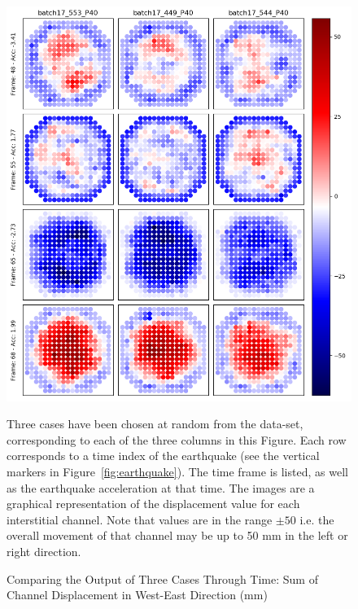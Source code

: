 \begin{figure}[p]
	\centering
	\includegraphics[scale=0.45]{Figures/results1.png}
	\caption{Comparing the Output of Three Cases Through Time: Sum of Channel Displacement in West-East Direction (mm) } { Three cases have been chosen at random from the data-set, corresponding to each of the three columns in this Figure. Each row corresponds to a time index of the earthquake (see the vertical markers in Figure~\ref{fig:earthquake}). The time frame is listed, as well as the earthquake acceleration at that time. The images are a graphical representation of the displacement value for each interstitial channel. Note that values are in the range $ \pm 50 $ i.e. the overall movement of that channel may be up to 50 mm in the left or right direction.}
	\label{fig:results1}
\end{figure}

